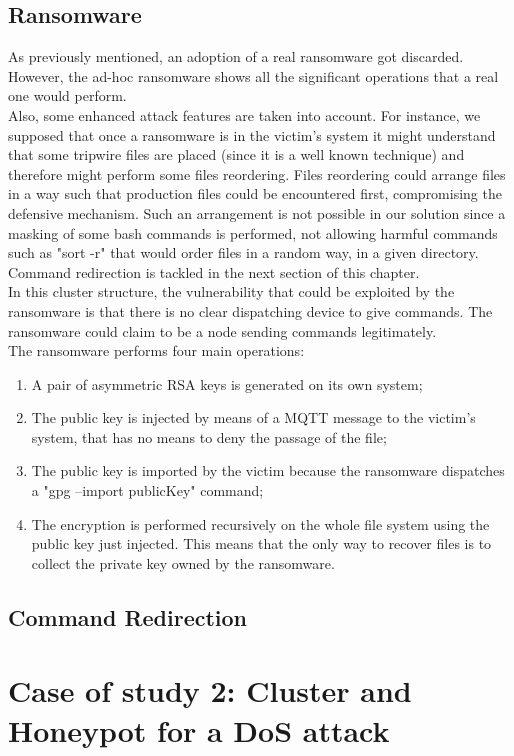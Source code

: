 \subsection{Ransomware}

As previously mentioned, an adoption of a real ransomware got discarded. However, the ad-hoc ransomware shows all the significant operations that a real one would perform.\\
Also, some enhanced attack features are taken into account. For instance, we supposed that once a ransomware is in the victim's system it might understand that some tripwire files are placed (since it is a well known technique) and therefore might perform some files reordering. Files reordering could arrange files in a way such that production files could be encountered first, compromising the defensive mechanism. Such an arrangement is not possible in our solution since a masking of some bash commands is performed, not allowing harmful commands such as "sort -r" that would order files in a random way, in a given directory. Command redirection is tackled in the next section of this chapter.\\
In this cluster structure, the vulnerability that could be exploited by the ransomware is that there is no clear dispatching device to give commands. The ransomware could claim to be a node sending commands legitimately.\\
The ransomware performs four main operations:

\begin{enumerate}
  \item A pair of asymmetric RSA keys is generated on its own system;
  \item The public key is injected by means of a MQTT message to the victim's system, that has no means to deny the passage of the file;
  \item The public key is imported by the victim because the ransomware dispatches a "gpg --import publicKey" command;
  \item The encryption is performed recursively on the whole file system using the public key just injected. This means that the only way to recover files is to collect the private key owned by the ransomware.
\end{enumerate}


\subsection{Command Redirection}
\section{Case of study 2: Cluster and Honeypot for a DoS attack}
